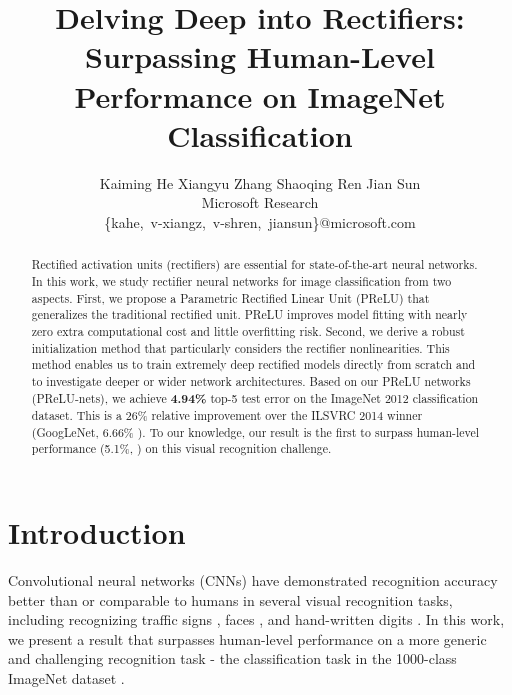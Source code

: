 \documentclass[10pt,twocolumn,letterpaper]{article}
\begin{document}
\title{Delving Deep into Rectifiers:\\Surpassing Human-Level Performance on ImageNet Classification}

\author{Kaiming He \qquad Xiangyu Zhang \qquad Shaoqing Ren \qquad Jian Sun \vspace{12pt}\\
Microsoft Research\\
\normalsize
\{kahe,~v-xiangz,~v-shren,~jiansun\}@microsoft.com
}

\maketitle

\begin{abstract}
Rectified activation units (rectifiers) are essential for state-of-the-art neural networks. In this work, we study rectifier neural networks for image classification from two aspects. First, we propose a Parametric Rectified Linear Unit (PReLU) that generalizes the traditional rectified unit. PReLU improves model fitting with nearly zero extra computational cost and little overfitting risk. Second, we derive a robust initialization method that particularly considers the rectifier nonlinearities. This method enables us to train extremely deep rectified models directly from scratch and to investigate deeper or wider network architectures.
Based on our PReLU networks (PReLU-nets), we achieve \textbf{4.94\%} top-5 test error on the ImageNet 2012 classification dataset. This is a 26\% relative improvement over the ILSVRC 2014 winner (GoogLeNet, 6.66\% \cite{Szegedy2014}). To our knowledge, our result is the first to surpass human-level performance (5.1\%, \cite{Russakovsky2014}) on this visual recognition challenge.
\end{abstract}

\section{Introduction}

Convolutional neural networks (CNNs) \cite{LeCun1989,Krizhevsky2012} have demonstrated recognition accuracy better than or comparable to humans in several visual recognition tasks, including recognizing traffic signs \cite{Ciresan2012}, faces \cite{Taigman2014,Sun2014}, and hand-written digits \cite{Ciresan2012,Wan2013}. In this work, we present a result that surpasses human-level performance on a more generic and challenging recognition task - the classification task in the 1000-class ImageNet dataset \cite{Russakovsky2014}.
\end{document}
